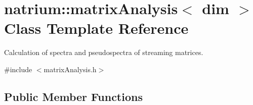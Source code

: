 \hypertarget{classnatrium_1_1matrixAnalysis}{\section{natrium\-:\-:matrix\-Analysis$<$ dim $>$ Class Template Reference}
\label{classnatrium_1_1matrixAnalysis}
}


Calculation of spectra and pseudospectra of streaming matrices.  




{\ttfamily \#include $<$matrix\-Analysis.\-h$>$}

\subsection*{Public Member Functions}

